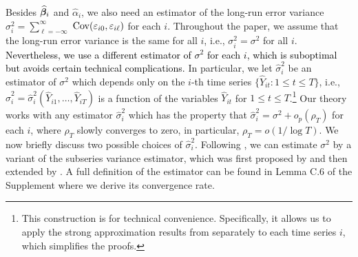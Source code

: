 \documentclass[12pt]{article}
\begin{document}
Besides $\widehat{\bm{\beta}}_i$ and $\widehat{\alpha}_i$, we also need an estimator of the long-run error variance $\sigma_i^2 = \sum\nolimits_{\ell=-\infty}^{\infty}$ $\textnormal{Cov}(\varepsilon_{i0}, \varepsilon_{i\ell})$ for each $i$. Throughout the paper, we assume that the long-run error variance is the same for all $i$, i.e., $\sigma_i^2 = \sigma^2$ for all $i$. \textcolor{black}{Nevertheless, we use a different estimator of $\sigma^2$ for each $i$, which is suboptimal but avoids certain technical complications.} In particular, we let $\widehat{\sigma}_i^2$ be an estimator of $\sigma^2$ which depends only on the $i$-th time series $\{ \widehat{Y}_{it}: 1 \le t \le T \}$, i.e., $\widehat{\sigma}_i^2 = \widehat{\sigma}_i^2(\widehat{Y}_{i1},\ldots,\widehat{Y}_{iT})$ is a function of the variables $\widehat{Y}_{it}$ for $1 \le t \le T$.\footnote{This construction is for technical convenience. Specifically, it allows us to apply the strong approximation results from \cite{BerkesLiuWu2014} separately to each time series $i$, which simplifies the proofs.} Our theory works with any estimator $\widehat{\sigma}_i^2$ which has the property that $\widehat{\sigma}_i^2 = \sigma^2 + o_p(\rho_T)$ for each $i$, where $\rho_T$ slowly converges to zero, in particular, $\rho_T = o(1/\log T)$. We now briefly discuss two possible choices of $\widehat{\sigma}_i^2$. Following \cite{Kim2016}, we can estimate $\sigma^2$ by a variant of the subseries variance estimator, which was first proposed by \cite{Carlstein1986} and then extended by \cite{WuZhao2007}. A full definition of the estimator can be found in Lemma C.6 %
of the Supplement where we derive its convergence rate. 
\end{document}
